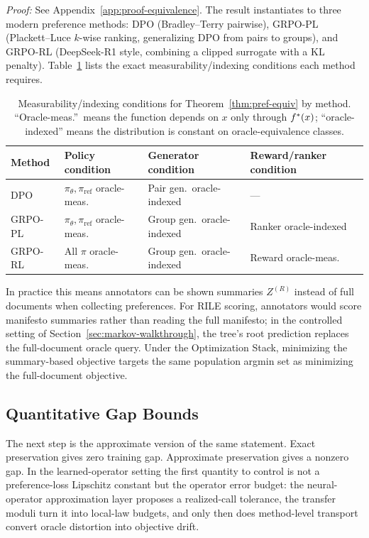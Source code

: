 \noindent\textit{Proof:} See Appendix~\ref{app:proof-equivalence}. The result instantiates to three modern preference methods: DPO (Bradley--Terry pairwise), GRPO-PL (Plackett--Luce $k$-wise ranking, generalizing DPO from pairs to groups), and GRPO-RL (DeepSeek-R1 style, combining a clipped surrogate with a KL penalty). Table~\ref{tab:measurability} lists the exact measurability/indexing conditions each method requires.
\begin{table}[t]
\centering\small
\begin{tabular}{llll}
\toprule
Method & Policy condition & Generator condition & Reward/ranker condition \\
\midrule
DPO & $\pi_\theta, \pi_{\mathrm{ref}}$ oracle-meas.\ & Pair gen.\ oracle-indexed & --- \\
GRPO-PL & $\pi_\theta, \pi_{\mathrm{ref}}$ oracle-meas.\ & Group gen.\ oracle-indexed & Ranker oracle-indexed \\
GRPO-RL & All $\pi$ oracle-meas.\ & Group gen.\ oracle-indexed & Reward oracle-meas.\ \\
\bottomrule
\end{tabular}
\caption{Measurability/indexing conditions for Theorem~\ref{thm:pref-equiv} by method. ``Oracle-meas.''\ means the function depends on $x$ only through $f^\ast(x)$; ``oracle-indexed'' means the distribution is constant on oracle-equivalence classes.}
\label{tab:measurability}
\end{table}

In practice this means annotators can be shown summaries $Z^{(R)}$ instead of full documents when collecting preferences. For RILE scoring, annotators would score manifesto summaries rather than reading the full manifesto; in the controlled setting of Section~\ref{sec:markov-walkthrough}, the tree's root prediction replaces the full-document oracle query. Under the Optimization Stack, minimizing the summary-based objective targets the same population argmin set as minimizing the full-document objective.

\subsection{Quantitative Gap Bounds}

The next step is the approximate version of the same statement. Exact preservation gives zero training gap. Approximate preservation gives a nonzero gap. In the learned-operator setting the first quantity to control is not a preference-loss Lipschitz constant but the operator error budget: the neural-operator approximation layer proposes a realized-call tolerance, the transfer moduli turn it into local-law budgets, and only then does method-level transport convert oracle distortion into objective drift.


